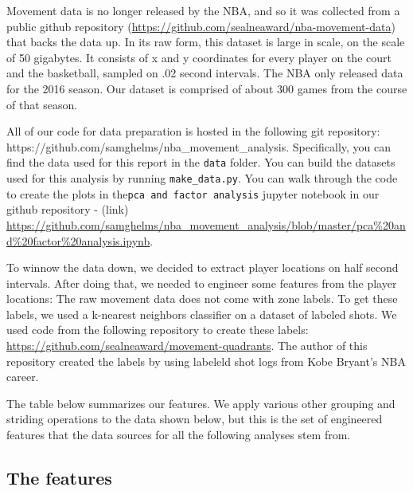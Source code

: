 \documentclass[]{article}
\begin{document}
Movement data is no longer released by the NBA, and so it was collected
from a public github repository
(\url{https://github.com/sealneaward/nba-movement-data}) that backs the
data up. In its raw form, this dataset is large in scale, on the scale
of 50 gigabytes. It consists of x and y coordinates for every player on
the court and the basketball, sampled on .02 second intervals. The NBA
only released data for the 2016 season. Our dataset is comprised of
about 300 games from the course of that season.

All of our code for data preparation is hosted in the following git
repository: https://github.com/samghelms/nba\_movement\_analysis.
Specifically, you can find the data used for this report in the
\texttt{data} folder. You can build the datasets used for this analysis
by running \texttt{make\_data.py}. You can walk through the code to
create the plots in the\texttt{pca\ and\ factor\ analysis} jupyter
notebook in our github repository - (link)
\url{https://github.com/samghelms/nba_movement_analysis/blob/master/pca\%20and\%20factor\%20analysis.ipynb}.

To winnow the data down, we decided to extract player locations on half
second intervals. After doing that, we needed to engineer some features
from the player locations: The raw movement data does not come with zone
labels. To get these labels, we used a k-nearest neighbors classifier on
a dataset of labeled shots. We used code from the following repository
to create these labels:
\url{https://github.com/sealneaward/movement-quadrants}. The author of
this repository created the labels by using labeleld shot logs from Kobe
Bryant's NBA career.

The table below summarizes our features. We apply various other grouping
and striding operations to the data shown below, but this is the set of
engineered features that the data sources for all the following analyses
stem from.

\hypertarget{the-features}{%
\subsection{The features}\label{the-features}}
\end{document}
